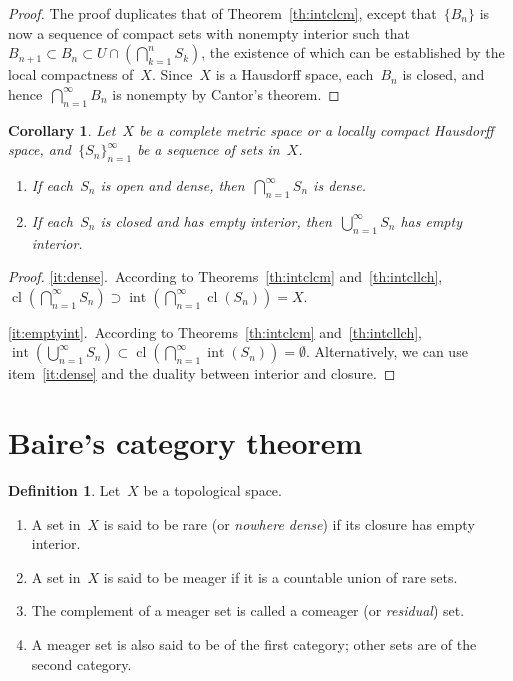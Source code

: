 \documentclass[11pt,a4paper]{article}  %
\newtheorem{corollary}{Corollary}[section]
\theoremstyle{definition}
\newtheorem{definition}{Definition}[section]
\DeclareMathOperator{\inter}{int}
\DeclareMathOperator{\cl}{cl}
\numberwithin{equation}{section}
\begin{document}
\begin{proof}
  The proof duplicates that of Theorem~\ref{th:intclcm}, except that~$\{B_n\}$ is now a sequence of
  compact sets with nonempty interior such that
  $B_{n+1} \subset B_n \subset U \cap (\bigcap_{k=1}^n S_k)$, the existence of which can be
 established by the local compactness of~$X$.  Since~$X$ is a Hausdorff space, each~$B_n$ is closed,
 and hence~$\bigcap_{n=1}^\infty B_n$ is nonempty by Cantor's theorem.
\end{proof}

\begin{corollary}
    \label{coro:intcl}
    Let~$X$ be a complete metric space or a locally compact Hausdorff space,
    and~$\{S_n\}_{n=1}^\infty$ be a sequence of sets in~$X$.
    \begin{enumerate}
        \item\label{it:dense} If each~$S_n$ is open and dense, then~$\bigcap_{n=1}^\infty S_n$ is dense.
        \item\label{it:emptyint} If each~$S_n$ is closed and has empty interior, then~$\bigcup_{n=1}^\infty S_n$ has empty interior.
    \end{enumerate}
\end{corollary}

\begin{proof}
    \ref{it:dense}.~According to Theorems~\ref{th:intclcm} and~\ref{th:intcllch},
    $\cl(\bigcap_{n=1}^\infty S_n) \supset \inter( \bigcap_{n=1}^\infty \cl(S_n)) = X$.

    \ref{it:emptyint}.~According to Theorems~\ref{th:intclcm} and~\ref{th:intcllch},
    $\inter(\bigcup_{n=1}^\infty S_n) \subset \cl(\bigcap_{n=1}^\infty \inter(S_n)) = \emptyset$.
    Alternatively, we can use item~\ref{it:dense} and the duality between interior and closure.
\end{proof}


\section{Baire's category theorem}

\begin{definition}
Let~$X$ be a topological space.
\begin{enumerate}
  \item A set in~$X$ is said to be rare (or \emph{nowhere dense}) if its closure has empty interior.
  \item A set in~$X$ is said to be meager if it is a countable union of rare sets.
  \item The complement of a meager set is called a comeager (or \emph{residual}) set.
  \item A meager set is also said to be of the first category; other sets are
    of the second category.
\end{enumerate}
\end{definition}
\end{document}
